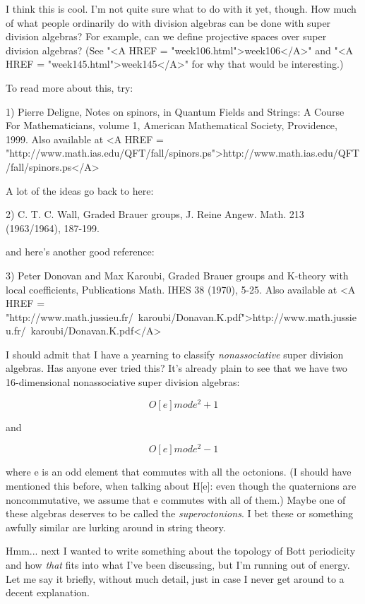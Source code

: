 I think this is cool.  I'm not quite sure what to do with it yet,
though.  How much of what people ordinarily do with division algebras
can be done with super division algebras?  For example, can we define
projective spaces over super division algebras?  (See "<A HREF = "week106.html">week106</A>" and
"<A HREF = "week145.html">week145</A>" for why that would be interesting.)

To read more about this, try:

1) Pierre Deligne, Notes on spinors, in Quantum Fields and Strings: 
A Course For Mathematicians, volume 1, American Mathematical Society, 
Providence, 1999.  Also available at 
<A HREF = "http://www.math.ias.edu/QFT/fall/spinors.ps">http://www.math.ias.edu/QFT/fall/spinors.ps</A>

A lot of the ideas go back to here:

2) C. T. C. Wall, Graded Brauer groups, J. Reine Angew. Math. 213
(1963/1964), 187-199.

and here's another good reference:

3) Peter Donovan and Max Karoubi, Graded Brauer groups and K-theory
with local coefficients, Publications Math. IHES 38 (1970), 5-25.
Also available at 
<A HREF = "http://www.math.jussieu.fr/~karoubi/Donavan.K.pdf">http://www.math.jussieu.fr/~karoubi/Donavan.K.pdf</A>

I should admit that I have a yearning to classify \emph{nonassociative}
super division algebras.  Has anyone ever tried this?  It's already 
plain to see that we have two 16-dimensional nonassociative super 
division algebras:


$$

O[e] mod e^{2} + 1
$$
    
and


$$

O[e] mod e^{2} - 1
$$
    

where e is an odd element that commutes with all the octonions.
(I should have mentioned this before, when talking about H[e]:
even though the quaternions are noncommutative, we assume that
e commutes with all of them.)  Maybe one of these algebras 
deserves to be called the \emph{superoctonions}.  I bet these or 
something awfully similar are lurking around in string theory.  

Hmm... next I wanted to write something about the topology of Bott
periodicity and how \emph{that} fits into what I've been discussing,
but I'm running out of energy.  Let me say it briefly, without much
detail, just in case I never get around to a decent explanation.  

